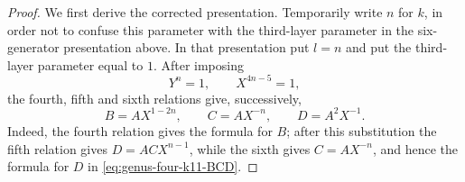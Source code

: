 \documentclass{article}
\begin{document}
\begin{proof}
We first derive the corrected presentation.  Temporarily write $n$ for
$k$, in order not to confuse this parameter with the third-layer
parameter in the six-generator presentation above.  In that
presentation put $l=n$ and put the third-layer parameter equal to $1$.
After imposing
\[
 Y^n=1,
 \qquad
 X^{4n-5}=1,
\]
the fourth, fifth and sixth relations give, successively,
\begin{equation}
\label{eq:genus-four-k11-BCD}
 B=AX^{1-2n},
 \qquad
 C=AX^{-n},
 \qquad
 D=A^2X^{-1}.
\end{equation}
Indeed, the fourth relation gives the formula for $B$; after this
substitution the fifth relation gives
$D=ACX^{n-1}$, while the sixth gives $C=AX^{-n}$, and hence the
formula for $D$ in \eqref{eq:genus-four-k11-BCD}.


\end{proof}
\end{document}
